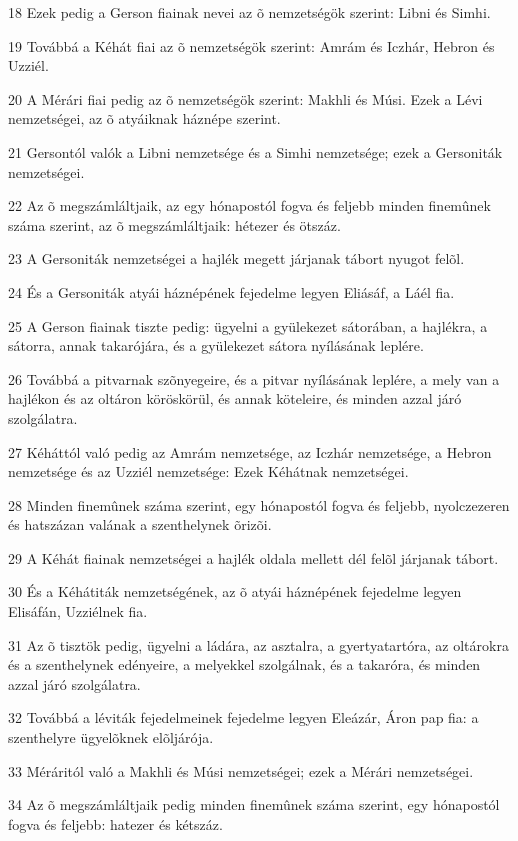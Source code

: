 \par 18 Ezek pedig a Gerson fiainak nevei az õ nemzetségök szerint: Libni és Simhi.
\par 19 Továbbá a Kéhát fiai az õ nemzetségök szerint: Amrám és Iczhár, Hebron és Uzziél.
\par 20 A Mérári fiai pedig az õ nemzetségök szerint: Makhli és Músi. Ezek a Lévi nemzetségei, az õ atyáiknak háznépe szerint.
\par 21 Gersontól valók a Libni nemzetsége és a Simhi nemzetsége; ezek a Gersoniták nemzetségei.
\par 22 Az õ megszámláltjaik, az egy hónapostól fogva és feljebb minden finemûnek száma szerint, az õ megszámláltjaik: hétezer és ötszáz.
\par 23 A Gersoniták nemzetségei a hajlék megett járjanak tábort nyugot felõl.
\par 24 És a Gersoniták atyái háznépének fejedelme legyen Eliásáf, a Láél fia.
\par 25 A Gerson fiainak tiszte pedig: ügyelni a gyülekezet sátorában, a hajlékra, a sátorra, annak takarójára, és a gyülekezet sátora nyílásának leplére.
\par 26 Továbbá a pitvarnak szõnyegeire, és a pitvar nyílásának leplére, a mely van a hajlékon és az oltáron köröskörül, és annak köteleire, és minden azzal járó szolgálatra.
\par 27 Kéháttól való pedig az Amrám nemzetsége, az Iczhár nemzetsége, a Hebron nemzetsége és az Uzziél nemzetsége: Ezek Kéhátnak nemzetségei.
\par 28 Minden finemûnek száma szerint, egy hónapostól fogva és feljebb, nyolczezeren és hatszázan valának a szenthelynek õrizõi.
\par 29 A Kéhát fiainak nemzetségei a hajlék oldala mellett dél felõl járjanak tábort.
\par 30 És a Kéhátiták nemzetségének, az õ atyái háznépének fejedelme legyen Elisáfán, Uzziélnek fia.
\par 31 Az õ tisztök pedig, ügyelni a ládára, az asztalra, a gyertyatartóra, az oltárokra és a szenthelynek edényeire, a melyekkel szolgálnak, és a takaróra, és minden azzal járó szolgálatra.
\par 32 Továbbá a léviták fejedelmeinek fejedelme legyen Eleázár, Áron pap fia: a szenthelyre ügyelõknek elõljárója.
\par 33 Méráritól való a Makhli és Músi nemzetségei; ezek a Mérári nemzetségei.
\par 34 Az õ megszámláltjaik pedig minden finemûnek száma szerint, egy hónapostól fogva és feljebb: hatezer és kétszáz.
